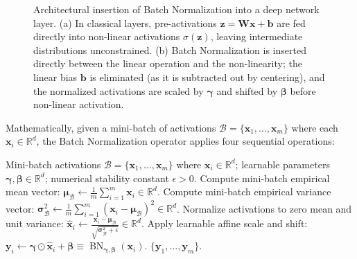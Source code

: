 \begin{figure}[H]
\caption{Architectural insertion of Batch Normalization into a deep network layer. (a) In classical layers, pre-activations $\mathbf{z} = \mathbf{W}\mathbf{x} + \mathbf{b}$ are fed directly into non-linear activations $\sigma(\mathbf{z})$, leaving intermediate distributions unconstrained. (b) Batch Normalization is inserted directly between the linear operation and the non-linearity; the linear bias $\mathbf{b}$ is eliminated (as it is subtracted out by centering), and the normalized activations are scaled by $\boldsymbol{\gamma}$ and shifted by $\boldsymbol{\beta}$ before non-linear activation.}
\label{fig:batch_norm_insertion_diagram}
\end{figure}

Mathematically, given a mini-batch of activations $\mathcal{B} = \{\mathbf{x}_1, \dots, \mathbf{x}_m\}$ where each $\mathbf{x}_i \in \mathbb{R}^d$, the Batch Normalization operator applies four sequential operations:
\begin{algorithm}[H]
\caption{Batch Normalization Forward Pass (Ioffe \& Szegedy, 2015)}
\label{alg:batch_normalization}
\begin{algorithmic}[1]
\Require Mini-batch activations $\mathcal{B} = \{\mathbf{x}_1, \dots, \mathbf{x}_m\}$ where $\mathbf{x}_i \in \mathbb{R}^d$; learnable parameters $\boldsymbol{\gamma}, \boldsymbol{\beta} \in \mathbb{R}^d$; numerical stability constant $\epsilon > 0$.
\State Compute mini-batch empirical mean vector:
\Statex \qquad\qquad $\boldsymbol{\mu}_{\mathcal{B}} \leftarrow \frac{1}{m} \sum_{i=1}^m \mathbf{x}_i \in \mathbb{R}^d$.
\State Compute mini-batch empirical variance vector:
\Statex \qquad\qquad $\boldsymbol{\sigma}_{\mathcal{B}}^2 \leftarrow \frac{1}{m} \sum_{i=1}^m (\mathbf{x}_i - \boldsymbol{\mu}_{\mathcal{B}})^2 \in \mathbb{R}^d$.
\State Normalize activations to zero mean and unit variance:
\Statex \qquad\qquad $\hat{\mathbf{x}}_i \leftarrow \frac{\mathbf{x}_i - \boldsymbol{\mu}_{\mathcal{B}}}{\sqrt{\boldsymbol{\sigma}_{\mathcal{B}}^2 + \epsilon}} \in \mathbb{R}^d$.
\State Apply learnable affine scale and shift:
\Statex \qquad\qquad $\mathbf{y}_i \leftarrow \boldsymbol{\gamma} \odot \hat{\mathbf{x}}_i + \boldsymbol{\beta} \equiv \operatorname{BN}_{\boldsymbol{\gamma}, \boldsymbol{\beta}}(\mathbf{x}_i)$.
\State \Return $\{\mathbf{y}_1, \dots, \mathbf{y}_m\}$.
\end{algorithmic}
\end{algorithm}

